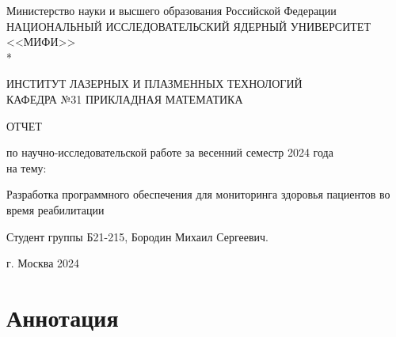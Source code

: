 \documentclass[a4paper,12pt]{article}
\begin{document}
	\renewcommand{\contentsname}{\Large Содержание}
	\renewcommand{\bibname}{\normalfont\Large\bfseries Список литературы}

	\begin{titlepage}
		\begin{center}
			Министерство науки и высшего образования Российской Федерации \\
			НАЦИОНАЛЬНЫЙ ИССЛЕДОВАТЕЛЬСКИЙ ЯДЕРНЫЙ УНИВЕРСИТЕТ <<МИФИ>> \\*
			\hrulefill
		\end{center}

		\begin{center}
			ИНСТИТУТ ЛАЗЕРНЫХ И ПЛАЗМЕННЫХ ТЕХНОЛОГИЙ\\
			КАФЕДРА №31 ПРИКЛАДНАЯ МАТЕМАТИКА
		\end{center}
		\vspace{1cm}

		\vspace{2em}

		\begin{center}
			\large{ОТЧЕТ}

			по научно-исследовательской работе
			за весенний семестр 2024 года \\

			на тему:
		\end{center}

		\begin{center}
			\large Разработка программного обеспечения для мониторинга здоровья пациентов во время реабилитации

		\end{center}

		\begin{center}
			\large Студент группы Б21-215, Бородин Михаил Сергеевич.
		\end{center}



		\vspace{25em}

		\begin{center}
			г. Москва 2024
		\end{center}
	\end{titlepage}

	\newpage
	\tableofcontents
	\setcounter{page}{3}

	\newpage
	\section*{Аннотация}
\end{document}
